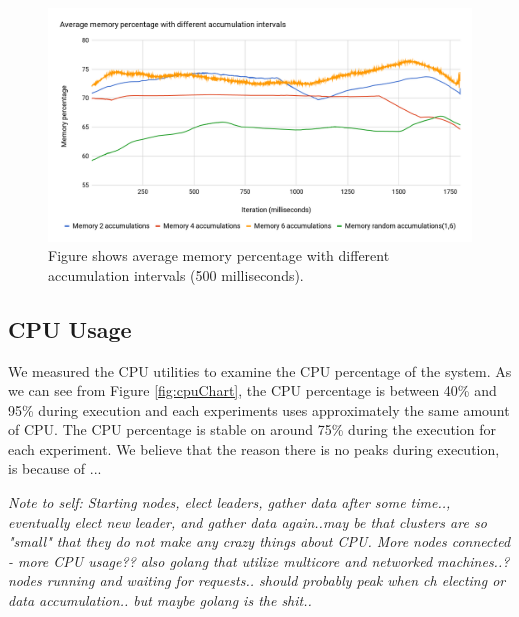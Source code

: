 \documentclass[USenglish]{uit-thesis}
\begin{document}

\begin{figure} [!b]
\centering
\includegraphics[width=\textwidth]{memChart2.png}
\caption{Figure shows average memory percentage with different accumulation intervals (500 milliseconds).}
\label{fig:memChart}
\end{figure}


\subsection{CPU Usage}
We measured the CPU utilities to examine the CPU percentage of the system. As we can see from Figure \ref{fig:cpuChart}, the CPU percentage is between 40\% and 95\% during execution and each experiments uses approximately the same amount of CPU.
The CPU percentage is stable on around 75\% during the execution for each experiment. We believe that the reason there is no peaks during execution, is because of ...

\textit{Note to self: Starting nodes, elect leaders, gather data after some time.., eventually elect new leader, and gather data again..may be that clusters are so "small" that they do not make any crazy things about CPU. More nodes connected - more CPU usage?? also golang that utilize multicore and networked machines..? nodes running and waiting for requests.. should probably peak when ch electing or data accumulation.. but maybe golang is the shit..}

\end{document}
